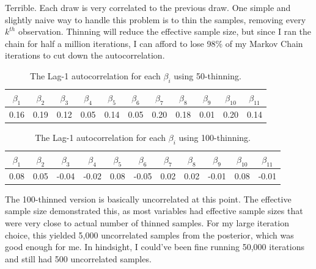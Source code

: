 \documentclass[12pt]{article}
\begin{document}
Terrible. Each draw is very correlated to the previous draw. One simple and slightly naive way to handle this problem is to thin the samples, removing every $k^{th}$ observation. Thinning will reduce the effective sample size, but since I ran the chain for half a million iterations, I can afford to lose 98\% of my Markov Chain iterations to cut down the autocorrelation.
\begin{table}[H] \center
\begin{tabular}{|ccccccccccc|} \hline
$\beta_1$ & $\beta_2$ & $\beta_3$ & $\beta_4$ & $\beta_5$ & $\beta_6$ & $\beta_7$ & $\beta_8$ & $\beta_9$ & $\beta_{10}$ & $\beta_{11}$ \\ \hline
0.16 & 0.19 & 0.12 & 0.05 & 0.14 & 0.05 & 0.20 & 0.18 & 0.01 & 0.20 & 0.14 \\ \hline
\end{tabular}
\caption*{The Lag-1 autocorrelation for each $\beta_i$ using 50-thinning.}
\end{table}

\begin{table}[H] \center
\begin{tabular}{|ccccccccccc|} \hline
$\beta_1$ & $\beta_2$ & $\beta_3$ & $\beta_4$ & $\beta_5$ & $\beta_6$ & $\beta_7$ & $\beta_8$ & $\beta_9$ & $\beta_{10}$ & $\beta_{11}$ \\ \hline
0.08 & 0.05 & -0.04 & -0.02 & 0.08 & -0.05 & 0.02 & 0.02 & -0.01 & 0.08 & -0.01 \\ \hline
\end{tabular}
\caption*{The Lag-1 autocorrelation for each $\beta_i$ using 100-thinning.}
\end{table}
The 100-thinned version is basically uncorrelated at this point. The effective sample size demonstrated this, as most variables had effective sample sizes that were very close to actual number of thinned samples. For my large iteration choice, this yielded 5,000 uncorrelated samples from the posterior, which was good enough for me. In hindsight, I could've been fine running 50,000 iterations and still had 500 uncorrelated samples.
\end{document}

